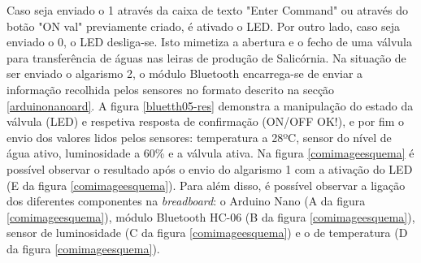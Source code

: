Caso seja enviado o 1 através da caixa de texto "Enter Command" ou através do botão "ON val" previamente criado, é ativado o \ac{LED}. Por outro lado, caso seja enviado o 0,  o \ac{LED} desliga-se. Isto mimetiza a abertura e o fecho de uma válvula para transferência de águas nas leiras de produção de Salicórnia. Na situação de ser enviado o algarismo 2, o módulo Bluetooth encarrega-se de enviar a informação recolhida pelos sensores no formato descrito na secção \ref{arduinonanoard}. A figura \ref{bluetth05-res} demonstra a manipulação do estado da válvula (\ac{LED}) e respetiva resposta de confirmação (ON/OFF OK!), e por fim o envio dos valores lidos pelos sensores: temperatura a 28ºC, sensor do nível de água ativo, luminosidade a 60\% e a válvula ativa. Na figura \ref{comimageesquema} é possível observar o resultado após o envio do algarismo 1 com a ativação do \ac{LED} (E da figura \ref{comimageesquema}). Para além disso, é possível observar a ligação dos diferentes componentes na \textit{breadboard}: o Arduino Nano (A da figura \ref{comimageesquema}), módulo Bluetooth HC-06 (B da figura \ref{comimageesquema}), sensor de luminosidade (C da figura \ref{comimageesquema}) e o de temperatura (D da figura \ref{comimageesquema}). 


